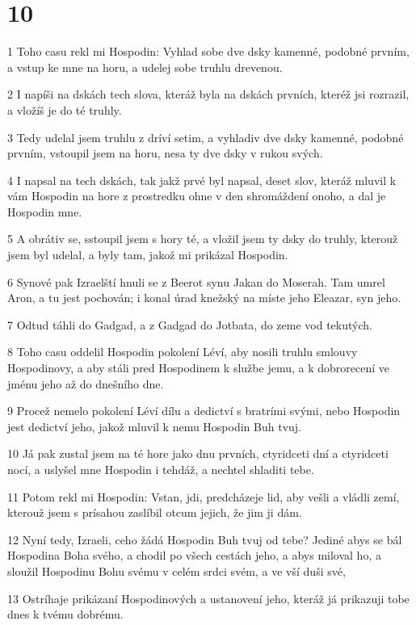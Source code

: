 \chapter{10}

\par 1 Toho casu rekl mi Hospodin: Vyhlad sobe dve dsky kamenné, podobné prvním, a vstup ke mne na horu, a udelej sobe truhlu drevenou.
\par 2 I napíši na dskách tech slova, kteráž byla na dskách prvních, kteréž jsi rozrazil, a vložíš je do té truhly.
\par 3 Tedy udelal jsem truhlu z dríví setim, a vyhladiv dve dsky kamenné, podobné prvním, vstoupil jsem na horu, nesa ty dve dsky v rukou svých.
\par 4 I napsal na tech dskách, tak jakž prvé byl napsal, deset slov, kteráž mluvil k vám Hospodin na hore z prostredku ohne v den shromáždení onoho, a dal je Hospodin mne.
\par 5 A obrátiv se, sstoupil jsem s hory té, a vložil jsem ty dsky do truhly, kterouž jsem byl udelal, a byly tam, jakož mi prikázal Hospodin.
\par 6 Synové pak Izraelští hnuli se z Beerot synu Jakan do Moserah. Tam umrel Aron, a tu jest pochován; i konal úrad knežský na míste jeho Eleazar, syn jeho.
\par 7 Odtud táhli do Gadgad, a z Gadgad do Jotbata, do zeme vod tekutých.
\par 8 Toho casu oddelil Hospodin pokolení Léví, aby nosili truhlu smlouvy Hospodinovy, a aby stáli pred Hospodinem k službe jemu, a k dobrorecení ve jménu jeho až do dnešního dne.
\par 9 Procež nemelo pokolení Léví dílu a dedictví s bratrími svými, nebo Hospodin jest dedictví jeho, jakož mluvil k nemu Hospodin Buh tvuj.
\par 10 Já pak zustal jsem na té hore jako dnu prvních, ctyridceti dní a ctyridceti nocí, a uslyšel mne Hospodin i tehdáž, a nechtel shladiti tebe.
\par 11 Potom rekl mi Hospodin: Vstan, jdi, predcházeje lid, aby vešli a vládli zemí, kterouž jsem s prísahou zaslíbil otcum jejich, že jim ji dám.
\par 12 Nyní tedy, Izraeli, ceho žádá Hospodin Buh tvuj od tebe? Jediné abys se bál Hospodina Boha svého, a chodil po všech cestách jeho, a abys miloval ho, a sloužil Hospodinu Bohu svému v celém srdci svém, a ve vší duši své,
\par 13 Ostríhaje prikázaní Hospodinových a ustanovení jeho, kteráž já prikazuji tobe dnes k tvému dobrému.
